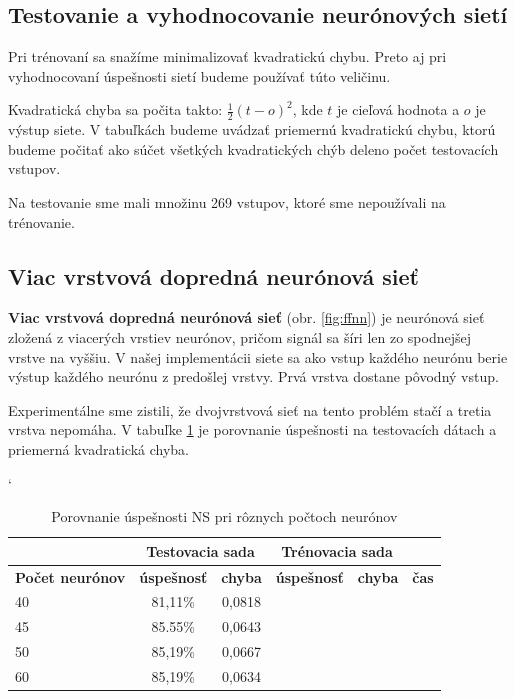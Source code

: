 
\subsection{Testovanie a vyhodnocovanie neurónových sietí}
Pri trénovaní sa snažíme minimalizovať kvadratickú chybu. Preto aj pri vyhodnocovaní úspešnosti sietí budeme používať túto veličinu.

Kvadratická chyba sa počita takto: $\frac{1}{2}(t-o)^2$, kde $t$ je cieľová hodnota a $o$ je výstup siete. V tabuľkách budeme uvádzať priemernú kvadratickú chybu, ktorú budeme počitať ako súčet všetkých kvadratických chýb deleno počet testovacích vstupov. 

Na testovanie sme mali množinu 269 vstupov, ktoré sme nepoužívali na trénovanie.



\subsection{Viac vrstvová dopredná neurónová sieť}


\textbf{Viac vrstvová dopredná neurónová sieť} (obr. \ref{fig:ffnn}) je neurónová sieť zložená z viacerých vrstiev neurónov, pričom signál sa šíri len zo spodnejšej vrstve na vyššiu. V našej implementácii siete sa ako vstup každého neurónu berie výstup každého neurónu z predošlej vrstvy. Prvá vrstva dostane pôvodný vstup. 

Experimentálne sme zistili, že dvojvrstvová sieť na tento problém stačí a tretia vrstva nepomáha.
V tabuľke \ref{tab:neuroncountcmp} je porovnanie úspešnosti na testovacích dátach a priemerná kvadratická chyba.

\begin{table}[h]
\catcode` %
\centering
\begin{tabular}{|l|c|c|c|c|c|}
\cline{2-5}
\multicolumn{1}{l}{} & \multicolumn{2}{|c|}{\textbf{Testovacia sada}} & \multicolumn{2}{c|}{\textbf{Trénovacia sada}} & \multicolumn{1}{l}{}\\ 
\hline
\textbf{Počet neurónov} & \textbf{úspešnosť} & \textbf{chyba} & \textbf{úspešnosť} & \textbf{chyba} & \textbf{čas} \\ \hline
40 & 81,11\% & 0,0818 & & &\\ \hline
45 & 85.55\% & 0,0643 & & &\\ \hline
50 & 85,19\% & 0,0667 & & &\\ \hline
60 & 85,19\% & 0,0634 & & &\\ 
\hline
\end{tabular}
\caption{Porovnanie úspešnosti NS pri rôznych počtoch neurónov}
\label{tab:neuroncountcmp}
\end{table}


